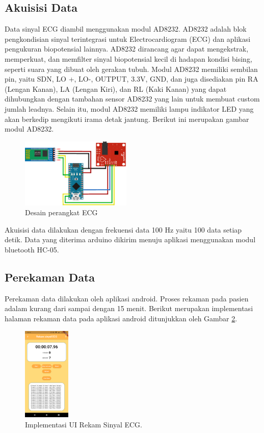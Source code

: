 \documentclass[conference]{IEEEtran}
\begin{document}
	\subsection{Akuisisi Data}
	\vspace{1ex}
	Data sinyal ECG diambil menggunakan modul AD8232. AD8232 adalah blok pengkondisian sinyal terintegrasi untuk Electrocardiogram (ECG) dan aplikasi pengukuran biopotensial lainnya. AD8232 dirancang agar dapat mengekstrak, memperkuat, dan memfilter sinyal biopotensial kecil di hadapan kondisi bising, seperti suara yang dibuat oleh gerakan tubuh. Modul AD8232 memiliki sembilan pin, yaitu SDN, LO +, LO-, OUTPUT, 3.3V, GND, dan juga disediakan pin RA (Lengan Kanan), LA (Lengan Kiri), dan RL (Kaki Kanan) yang dapat dihubungkan dengan tambahan sensor AD8232 yang lain untuk membuat custom jumlah leadnya. Selain itu, modul AD8232 memiliki lampu indikator LED yang akan berkedip mengikuti irama detak jantung\cite{cit:6}.
	Berikut ini merupakan gambar modul AD8232.
	\vspace{1ex}
	\begin{figure}[!ht] \centering
		\includegraphics[width=0.47\textwidth]{img/desainperangkat.png}
		\caption{Desain perangkat ECG}
		\label{Gambar:2}
	\end{figure}
	\vspace{1ex}
	Akuisisi data dilakukan dengan frekuensi data 100 Hz yaitu 100 data setiap detik. Data yang diterima arduino dikirim menuju aplikasi menggunakan modul bluetooth HC-05.
	
	\subsection{Perekaman Data}
	\vspace{1ex}
	Perekaman data dilakukan oleh aplikasi android. Proses rekaman pada pasien adalam kurang dari sampai dengan 15 menit.   Berikut merupakan implementasi halaman rekaman data pada aplikasi android ditunjukkan oleh Gambar \ref{fig:3.5}.
	
	\begin{figure}[h] \centering
		\includegraphics[width=0.2\textwidth]{img/layar_rekaman.png}
		\caption{Implementasi UI Rekam Sinyal ECG.}
		\label{fig:3.5}
	\end{figure}
	
\end{document}
